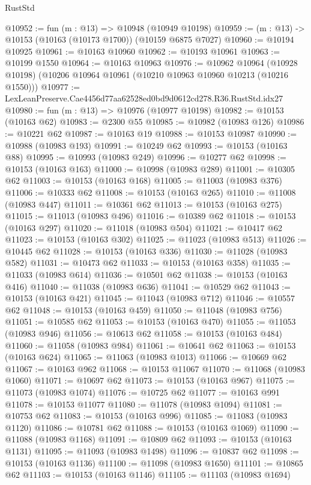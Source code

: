 \begin{lexlean}{RustStd}
\begin{coremodule}
@10952 := fun (m : @13) => @10948 (@10949 @10198)
@10959 := (m : @13) -> @10153 (@10163 (@10173 @1700)) (@10159 @6875 @7027)
@10960 := @10194 @10925
@10961 := @10163 @10960
@10962 := @10193 @10961
@10963 := @10199 @1550
@10964 := @10163 @10963
@10976 := @10962
    @10964
    (@10928 @10198)
    (@10206 @10964 @10961 (@10210 @10963 @10960 @10213 (@10216 @1550)))
@10977 := LexLeanPreserve.Cae4456d77aa62528ed0bd9d0612cd278.R36.RustStd.idx27
@10980 := fun (m : @13) => @10976 (@10977 @10198)
@10982 := @10153 (@10163 @62)
@10983 := @2300 @55
@10985 := @10982 (@10983 @126)
@10986 := @10221 @62
@10987 := @10163 @19
@10988 := @10153 @10987
@10990 := @10988 (@10983 @193)
@10991 := @10249 @62
@10993 := @10153 (@10163 @88)
@10995 := @10993 (@10983 @249)
@10996 := @10277 @62
@10998 := @10153 (@10163 @163)
@11000 := @10998 (@10983 @289)
@11001 := @10305 @62
@11003 := @10153 (@10163 @168)
@11005 := @11003 (@10983 @376)
@11006 := @10333 @62
@11008 := @10153 (@10163 @265)
@11010 := @11008 (@10983 @447)
@11011 := @10361 @62
@11013 := @10153 (@10163 @275)
@11015 := @11013 (@10983 @496)
@11016 := @10389 @62
@11018 := @10153 (@10163 @297)
@11020 := @11018 (@10983 @504)
@11021 := @10417 @62
@11023 := @10153 (@10163 @302)
@11025 := @11023 (@10983 @513)
@11026 := @10445 @62
@11028 := @10153 (@10163 @336)
@11030 := @11028 (@10983 @582)
@11031 := @10473 @62
@11033 := @10153 (@10163 @358)
@11035 := @11033 (@10983 @614)
@11036 := @10501 @62
@11038 := @10153 (@10163 @416)
@11040 := @11038 (@10983 @636)
@11041 := @10529 @62
@11043 := @10153 (@10163 @421)
@11045 := @11043 (@10983 @712)
@11046 := @10557 @62
@11048 := @10153 (@10163 @459)
@11050 := @11048 (@10983 @756)
@11051 := @10585 @62
@11053 := @10153 (@10163 @470)
@11055 := @11053 (@10983 @946)
@11056 := @10613 @62
@11058 := @10153 (@10163 @484)
@11060 := @11058 (@10983 @984)
@11061 := @10641 @62
@11063 := @10153 (@10163 @624)
@11065 := @11063 (@10983 @1013)
@11066 := @10669 @62
@11067 := @10163 @962
@11068 := @10153 @11067
@11070 := @11068 (@10983 @1060)
@11071 := @10697 @62
@11073 := @10153 (@10163 @967)
@11075 := @11073 (@10983 @1074)
@11076 := @10725 @62
@11077 := @10163 @991
@11078 := @10153 @11077
@11080 := @11078 (@10983 @1094)
@11081 := @10753 @62
@11083 := @10153 (@10163 @996)
@11085 := @11083 (@10983 @1120)
@11086 := @10781 @62
@11088 := @10153 (@10163 @1069)
@11090 := @11088 (@10983 @1168)
@11091 := @10809 @62
@11093 := @10153 (@10163 @1131)
@11095 := @11093 (@10983 @1498)
@11096 := @10837 @62
@11098 := @10153 (@10163 @1136)
@11100 := @11098 (@10983 @1650)
@11101 := @10865 @62
@11103 := @10153 (@10163 @1146)
@11105 := @11103 (@10983 @1694)

\end{coremodule}
\end{lexlean}
